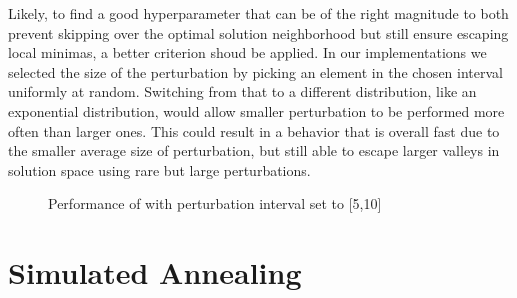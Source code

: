 Likely, to find a good hyperparameter that can be of the right magnitude to both prevent skipping over the optimal solution neighborhood but still ensure escaping local minimas, a better criterion shoud be applied. 
In our implementations we selected the size of the perturbation by picking an element in the chosen interval uniformly at random.
Switching from that to a different distribution, like an exponential distribution, would allow smaller perturbation to be performed more often than larger ones.
This could result in a behavior that is overall fast due to the smaller average size of perturbation, but still able to escape larger valleys in solution space using rare but large perturbations.

\begin{figure}[htbp]
	\centering
	\caption{Performance of with perturbation interval set to [5,10]} \label{fig:vnsCost}
\end{figure}


\newpage

\section{Simulated Annealing}

